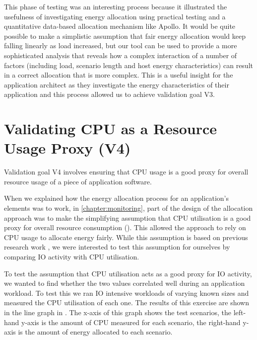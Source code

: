 This phase of testing was an interesting process because it illustrated the usefulness of investigating energy allocation using practical testing and a quantitative data-based allocation mechanism like Apollo.  It would be quite possible to make a simplistic assumption that fair energy allocation would keep falling linearly as load increased, but our tool can be used to provide a more sophisticated analysis that reveals how a complex interaction of a number of factors (including load, scenario length and host energy characteristics) can result in a correct allocation that is more complex.  This is a useful insight for the application architect as they investigate the energy characteristics of their application and this process allowed us to achieve validation goal V3.

\section{Validating CPU as a Resource Usage Proxy (V4)}

Validation goal V4 involves ensuring that CPU usage is a good proxy for overall resource usage of a piece of application software.

When we explained how the energy allocation process for an application's elements was to work, in \cref{chapter:monitoring}, part of the design of the allocation approach was to make the simplifying assumption that CPU utilisation is a good proxy for overall resource consumption ().  This allowed  the approach to rely on CPU usage to allocate energy fairly.  While this assumption is based on previous research work \cite{bashroush2018_hardwarerefresh}, we were interested to test this assumption for ourselves by comparing IO activity with CPU utilisation.  

To test the assumption that CPU utilisation acts as a good proxy for IO activity, we wanted to find whether the two values correlated well during an application workload.  To test this we ran IO intensive workloads of varying known sizes and measured the CPU utilisation of each one.  The results of this exercise are shown in the line graph in .  The x-axis of this graph shows the test scenarios, the left-hand y-axis is the amount of CPU measured for each scenario, the right-hand y-axis is the amount of energy allocated to each scenario.

